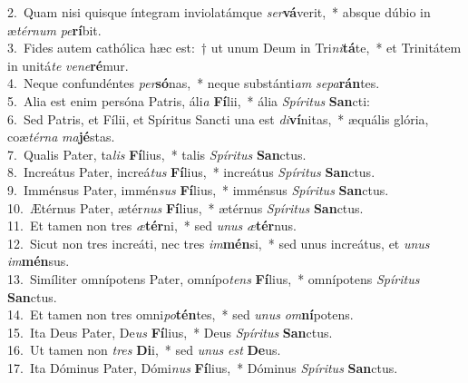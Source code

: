 {2.~}Quam nisi quisque íntegram inviolatámque \textit{ser}\textbf{vá}verit,~* absque dúbio in æ\textit{tér}\textit{num} \textit{pe}\textbf{rí}bit.\\
{3.~}Fides autem cathólica hæc est:~† ut unum Deum in Tri\textit{ni}\textbf{tá}te,~* et Trinitátem in unitá\textit{te} \textit{ve}\textit{ne}\textbf{ré}mur.\\
{4.~}Neque confundéntes \textit{per}\textbf{só}nas,~* neque substánti\textit{am} \textit{se}\textit{pa}\textbf{rán}tes.\\
{5.~}Alia est enim persóna Patris, áli\textit{a} \textbf{Fí}lii,~* ália \textit{Spí}\textit{ri}\textit{tus} \textbf{San}cti:\\
{6.~}Sed Patris, et Fílii, et Spíritus Sancti una est \textit{di}\textbf{ví}nitas,~* æquális glória, coæ\textit{tér}\textit{na} \textit{ma}\textbf{jé}stas.\\
{7.~}Qualis Pater, ta\textit{lis} \textbf{Fí}lius,~* talis \textit{Spí}\textit{ri}\textit{tus} \textbf{San}ctus.\\
{8.~}Increátus Pater, increá\textit{tus} \textbf{Fí}lius,~* increátus \textit{Spí}\textit{ri}\textit{tus} \textbf{San}ctus.\\
{9.~}Imménsus Pater, immén\textit{sus} \textbf{Fí}lius,~* imménsus \textit{Spí}\textit{ri}\textit{tus} \textbf{San}ctus.\\
{10.~}Ætérnus Pater, ætér\textit{nus} \textbf{Fí}lius,~* ætérnus \textit{Spí}\textit{ri}\textit{tus} \textbf{San}ctus.\\
{11.~}Et tamen non tres \textit{æ}\textbf{tér}ni,~* sed \textit{u}\textit{nus} \textit{æ}\textbf{tér}nus.\\
{12.~}Sicut non tres increáti, nec tres \textit{im}\textbf{mén}si,~* sed unus increátus, et \textit{u}\textit{nus} \textit{im}\textbf{mén}sus.\\
{13.~}Simíliter omnípotens Pater, omnípo\textit{tens} \textbf{Fí}lius,~* omnípotens \textit{Spí}\textit{ri}\textit{tus} \textbf{San}ctus.\\
{14.~}Et tamen non tres omni\textit{po}\textbf{tén}tes,~* sed \textit{u}\textit{nus} \textit{om}\textbf{ní}potens.\\
{15.~}Ita Deus Pater, De\textit{us} \textbf{Fí}lius,~* Deus \textit{Spí}\textit{ri}\textit{tus} \textbf{San}ctus.\\
{16.~}Ut tamen non \textit{tres} \textbf{Di}i,~* sed \textit{u}\textit{nus} \textit{est} \textbf{De}us.\\
{17.~}Ita Dóminus Pater, Dómi\textit{nus} \textbf{Fí}lius,~* Dóminus \textit{Spí}\textit{ri}\textit{tus} \textbf{San}ctus.\\
